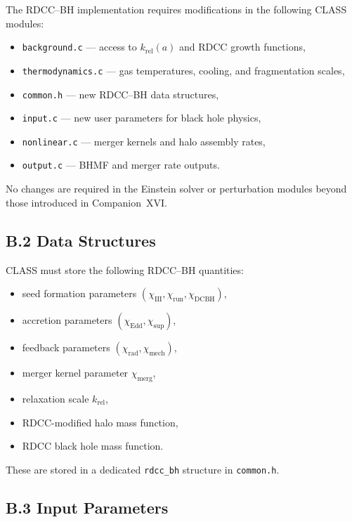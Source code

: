 \documentclass[11pt,a4paper]{article}
\begin{document}
The RDCC–BH implementation requires modifications in the following CLASS modules:

\begin{itemize}
    \item \texttt{background.c} — access to $k_{\mathrm{rel}}(a)$ and RDCC growth functions,
    \item \texttt{thermodynamics.c} — gas temperatures, cooling, and fragmentation scales,
    \item \texttt{common.h} — new RDCC–BH data structures,
    \item \texttt{input.c} — new user parameters for black hole physics,
    \item \texttt{nonlinear.c} — merger kernels and halo assembly rates,
    \item \texttt{output.c} — BHMF and merger rate outputs.
\end{itemize}

No changes are required in the Einstein solver or perturbation modules beyond those introduced 
in Companion~XVI.

\subsection*{B.2 Data Structures}

CLASS must store the following RDCC–BH quantities:

\begin{itemize}
    \item seed formation parameters $(\chi_{\mathrm{III}}, \chi_{\mathrm{run}}, \chi_{\mathrm{DCBH}})$,
    \item accretion parameters $(\chi_{\mathrm{Edd}}, \chi_{\mathrm{sup}})$,
    \item feedback parameters $(\chi_{\mathrm{rad}}, \chi_{\mathrm{mech}})$,
    \item merger kernel parameter $\chi_{\mathrm{merg}}$,
    \item relaxation scale $k_{\mathrm{rel}}$,
    \item RDCC-modified halo mass function,
    \item RDCC black hole mass function.
\end{itemize}

These are stored in a dedicated \texttt{rdcc\_bh} structure in \texttt{common.h}.

\subsection*{B.3 Input Parameters}
\end{document}

